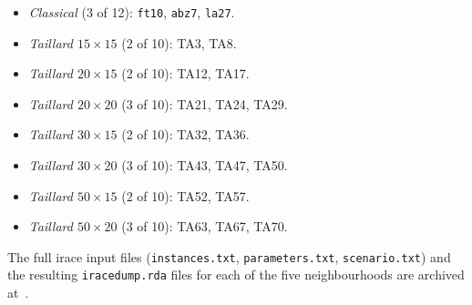 \documentclass[a4paper,11pt]{article}
\begin{document}
\begin{itemize}\setlength{\itemsep}{2pt}
  \item \emph{Classical} (3 of 12): \texttt{ft10}, \texttt{abz7}, \texttt{la27}.
  \item \emph{Taillard $15{\times}15$} (2 of 10): TA3, TA8.
  \item \emph{Taillard $20{\times}15$} (2 of 10): TA12, TA17.
  \item \emph{Taillard $20{\times}20$} (3 of 10): TA21, TA24, TA29.
  \item \emph{Taillard $30{\times}15$} (2 of 10): TA32, TA36.
  \item \emph{Taillard $30{\times}20$} (3 of 10): TA43, TA47, TA50.
  \item \emph{Taillard $50{\times}15$} (2 of 10): TA52, TA57.
  \item \emph{Taillard $50{\times}20$} (3 of 10): TA63, TA67, TA70.
\end{itemize}

\noindent
The full irace input files (\texttt{instances.txt}, \texttt{parameters.txt},
\texttt{scenario.txt}) and the resulting \texttt{iracedump.rda} files for
each of the five neighbourhoods are archived at~\cite{DiazData2026}.

\bigskip
\end{document}
